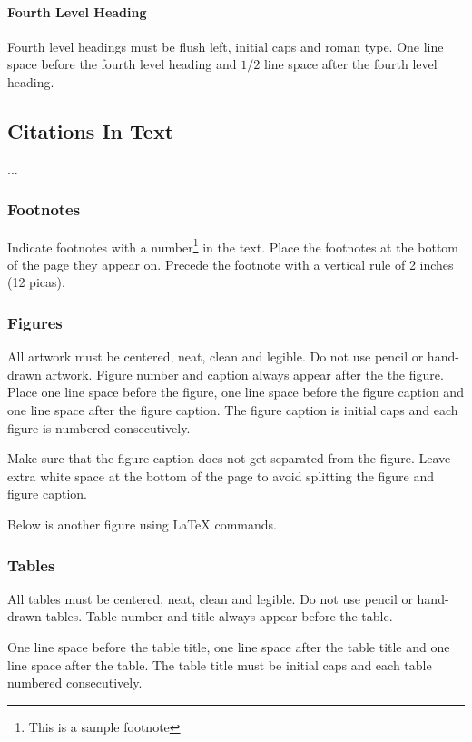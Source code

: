 \documentclass[a4paper]{article}
\begin{document}
\paragraph{Fourth Level Heading}

Fourth level headings must be flush left, initial caps and roman type.
One line space before the fourth level heading and $1/2$ line
space after the fourth level heading.

\subsection{Citations In Text}

...

\subsubsection{Footnotes}

Indicate footnotes with a number\footnote{This is a sample footnote} in
the text. Place the footnotes at the bottom of the page they appear on.
Precede the footnote with a vertical rule of 2 inches (12 picas).

\subsubsection{Figures}

All artwork must be centered, neat, clean and legible. Do not use pencil
or hand-drawn artwork. Figure number and caption always appear after the
the figure. Place one line space before the figure, one line space
before the figure caption and one line space after the figure caption.
The figure caption is initial caps and each figure is numbered
consecutively.

Make sure that the figure caption does not get separated from the
figure. Leave extra white space at the bottom of the page to avoid
splitting the figure and figure caption.

Below is another figure using LaTeX commands.



\subsubsection{Tables}

All tables must be centered, neat, clean and legible. Do not use pencil
or hand-drawn tables. Table number and title always appear before the
table.

One line space before the table title, one line space after the table
title and one line space after the table. The table title must be
initial caps and each table numbered consecutively.
\end{document}
